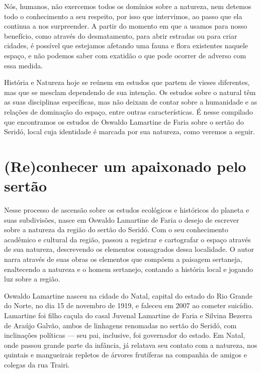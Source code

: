 \begin{refsection}
    Nós, humanos, não exercemos todos os domínios sobre a natureza, nem detemos todo o conhecimento a seu respeito, por isso que intervimos, ao passo que ela continua a nos surpreender. A partir do momento em que a usamos para nosso benefício, como através do desmatamento, para abrir estradas ou para criar cidades, é possível que estejamos afetando uma fauna e flora existentes naquele espaço, e não podemos saber com exatidão o que pode ocorrer de adverso com essa medida.  

    História e Natureza hoje se reúnem em estudos que partem de vieses diferentes, mas que se mesclam dependendo de sua intenção. Os estudos sobre o natural têm as suas disciplinas específicas, mas não deixam de contar sobre a humanidade e as relações de dominação do espaço, entre outras características. É nesse compilado que encontramos os estudos de Oswaldo Lamartine de Faria sobre o sertão do Seridó, local cuja identidade é marcada por sua natureza, como veremos a seguir. 


    \section{(Re)conhecer um apaixonado pelo sertão}

    Nesse processo de ascensão sobre os estudos ecológicos e históricos do planeta e suas subdivisões, nasce em Oswaldo Lamartine de Faria o desejo de escrever sobre a natureza da região do sertão do Seridó. Com o seu conhecimento acadêmico e cultural da região, passou a registrar e cartografar o espaço através de sua natureza, descrevendo os elementos consagrados dessa localidade. O autor narra através de suas obras os elementos que compõem a paisagem sertaneja, enaltecendo a natureza e o homem sertanejo, contando a história local e jogando luz sobre a região.  

    Oswaldo Lamartine nasceu na cidade do Natal, capital do estado do Rio Grande do Norte, no dia 15 de novembro de 1919, e faleceu em 2007 ao cometer suicídio. Lamartine foi filho caçula do casal Juvenal Lamartine de Faria e Silvina Bezerra de Araújo Galvão, ambos de linhagens renomadas no sertão do Seridó, com inclinações políticas --- seu pai, inclusive, foi governador do estado. Em Natal, onde passou grande parte da infância, já relatava seu contato com a natureza, nos quintais e mangueirais repletos de árvores frutíferas na companhia de amigos e colegas da rua Trairi.  


\end{refsection}
